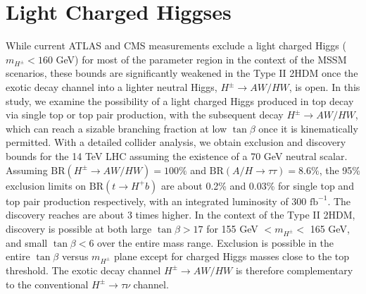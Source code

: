 \chapter{Light Charged Higgses}\label{ch:LightChargedHiggs}



\def\h{h^0}
\def\H{H^0}
\def\A{A}
\newcommand{\sba}{\ensuremath{\sin(\beta-\alpha)}}
\newcommand{\cba}{\ensuremath{\cos(\beta-\alpha)}}
\newcommand{\hc}{H^{\pm}}
\newcommand{\w}{W^{\pm}}
\newcommand{\Note}[1]{{\bf\color{red} #1}}
\newcommand{\met}{\ensuremath{{\not\mathrel{E}}_T}}
\newcommand{\ifb}{\ensuremath{ \text{fb}^{-1}  }}
\newcommand{\cmark}{\ding{51}}%
\newcommand{\xmark}{\ding{55}}%

While current ATLAS and CMS measurements exclude a light charged Higgs ($m_{H^\pm}<160$ GeV)  for most of the parameter region in the context of the MSSM scenarios, these bounds are significantly weakened in the Type II 2HDM once the exotic decay channel into a lighter neutral Higgs,  $H^\pm \to AW/HW$,  is open. In this study, we examine the possibility of a light charged Higgs produced in top decay via single top or top pair production,  with the subsequent decay $H^\pm \rightarrow AW/HW$,  which can reach a sizable branching fraction  at low $\tan\beta$ once it is  kinematically permitted. With a detailed collider analysis,  we obtain exclusion and discovery bounds for the 14 TeV LHC assuming the existence of a 70 GeV neutral scalar.  Assuming $\text{BR}(H^\pm \rightarrow AW/HW)=100\%$ and $\text{BR}(A/H \rightarrow \tau\tau)=8.6\%$,  the 95\% exclusion limits on $\text{BR}(t \rightarrow H^+ b)$ are about 0.2\% and 0.03\% for single top and top pair production respectively,  with an integrated luminosity of 300 $\text{fb}^{-1}$.  The discovery  reaches  are about 3 times higher. In the context of the Type II 2HDM,   discovery is possible at both large $\tan\beta > 17$ for 155 GeV $< m_{H^\pm} <$ 165 GeV,  and small $\tan\beta < 6$ over the entire mass range.   Exclusion is possible in the entire $\tan\beta$ versus $m_{H^\pm}$ plane except for charged Higgs masses close to the top threshold. The exotic decay channel $H^\pm \to AW/HW$ is therefore complementary to the conventional $H^\pm \rightarrow \tau\nu$ channel.
 
